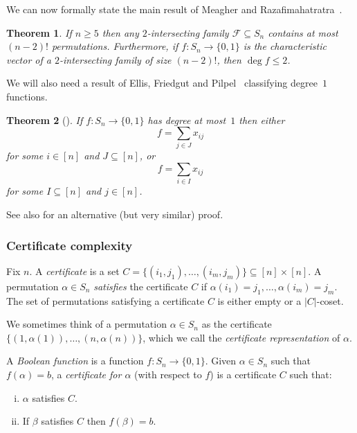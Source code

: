 \documentclass{article}
\newtheorem{theorem}{Theorem}[section]
\theoremstyle{definition}
\begin{document}
We can now formally state the main result of Meagher and Razafimahatratra~\cite[Corollary 5.5]{MR21}.

\begin{theorem} \label{thm:MR21}
If $n \geq 5$ then any $2$-intersecting family $\mathcal{F} \subseteq S_n$ contains at most $(n-2)!$ permutations. Furthermore, if $f\colon S_n \to \{0,1\}$ is the characteristic vector of a $2$-intersecting family of size $(n-2)!$, then $\deg f \leq 2$.
\end{theorem}

We will also need a result of Ellis, Friedgut and Pilpel~\cite{EFP} classifying degree~$1$ functions.

\begin{theorem}[{\cite[Corollary 2]{EFP}}] \label{thm:degree1-classification-sym}
If $f\colon S_n \to \{0,1\}$ has degree at most~$1$ then either
\[
 f = \sum_{j \in J} x_{ij}
\]
for some $i \in [n]$ and $J \subseteq [n]$, or
\[
 f = \sum_{i \in I} x_{ij}
\]
for some $I \subseteq [n]$ and $j \in [n]$.
\end{theorem}

See also \cite[Theorem 6.1]{DFLLV} for an alternative (but very similar) proof.

\subsubsection{Certificate complexity} \label{sec:certificate-sym}

Fix $n$. A \emph{certificate} is a set $C = \{(i_1,j_1),\ldots,(i_m,j_m)\} \subseteq [n] \times [n]$. A permutation $\alpha \in S_n$ \emph{satisfies} the certificate $C$ if $\alpha(i_1) = j_1,\ldots,\alpha(i_m) = j_m$. The set of permutations satisfying a certificate $C$ is either empty or a $|C|$-coset.

We sometimes think of a permutation $\alpha \in S_n$ as the certificate $\{(1,\alpha(1)),\ldots,(n,\alpha(n))\}$, which we call the \emph{certificate representation} of $\alpha$.

A \emph{Boolean function} is a function $f\colon S_n \to \{0,1\}$. Given $\alpha \in S_n$ such that $f(\alpha) = b$, a \emph{certificate for $\alpha$} (with respect to $f$) is a certificate $C$ such that:
\begin{enumerate}[(i)]
\item $\alpha$ satisfies $C$.
\item If $\beta$ satisfies $C$ then $f(\beta) = b$.
\end{enumerate}
\end{document}
